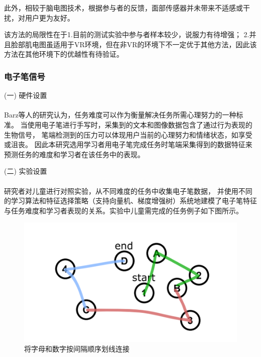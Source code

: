 \documentclass[12pt]{article}
\begin{document}
            此外，相较于脑电图技术，根据参与者的反馈，面部传感器并未带来不适感或干扰，对用户更为友好。

            该方法的局限性在于1.目前的测试实验中参与者样本较少，说服力有待增强；
            2.并且脸部肌电图虽适用于VR环境，但在非VR的环境下不一定优于其他方法，因此该方法在其他环境下的优越性有待验证。

            \subsubsection{电子笔信号}
            (一) 硬件设置\paragraph{}
            Barz等人\cite{ref10}的研究认为，任务难度可以作为衡量解决任务所需心理努力的一种标准。
            当使用电子笔进行手写时，采集到的文本和图像数据包含了通过行为表现的生物信号，
            笔端检测到的压力可以体现用户当前的心理努力和情绪状态，如享受或沮丧。
            因此本研究选用学习者用电子笔完成任务时笔端采集得到的数据特征来预测任务的难度和学习者在该任务中的表现。

            (二) 实验设置\paragraph{}
            研究者对儿童进行对照实验，从不同难度的任务中收集电子笔数据，
            并使用不同的学习算法和特征选择策略（支持向量机、梯度增强树）系统地建模了电子笔特征与任务难度和学习者表现的关系。实验中儿童需完成的任务例子如下图所示。

            \begin{figure}[H]
            	
            	\centering
            	\includegraphics[scale=0.5]{images/digital_pen.png}
            	\caption{将字母和数字按间隔顺序划线连接}
            	\label{fig:label}
            \end{figure}
\end{document}
